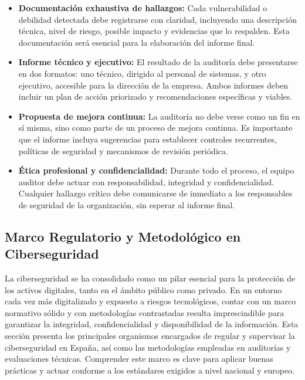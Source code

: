 \documentclass[a4paper, 11pt]{article}
\begin{document}
\begin{itemize}
    \item \textbf{Documentación exhaustiva de hallazgos:}  
    Cada vulnerabilidad o debilidad detectada debe registrarse con claridad, incluyendo una descripción técnica, nivel de riesgo, posible impacto y evidencias que lo respalden. Esta documentación será esencial para la elaboración del informe final.

    \item \textbf{Informe técnico y ejecutivo:}  
    El resultado de la auditoría debe presentarse en dos formatos: uno técnico, dirigido al personal de sistemas, y otro ejecutivo, accesible para la dirección de la empresa. Ambos informes deben incluir un plan de acción priorizado y recomendaciones específicas y viables.

    \item \textbf{Propuesta de mejora continua:}  
    La auditoría no debe verse como un fin en sí misma, sino como parte de un proceso de mejora continua. Es importante que el informe incluya sugerencias para establecer controles recurrentes, políticas de seguridad y mecanismos de revisión periódica.

    \item \textbf{Ética profesional y confidencialidad:}  
    Durante todo el proceso, el equipo auditor debe actuar con responsabilidad, integridad y confidencialidad. Cualquier hallazgo crítico debe comunicarse de inmediato a los responsables de seguridad de la organización, sin esperar al informe final.

\end{itemize}

\subsection{Marco Regulatorio y Metodológico en Ciberseguridad}

La ciberseguridad se ha consolidado como un pilar esencial para la protección de los activos digitales, tanto en el ámbito público como privado. En un entorno cada vez más digitalizado y expuesto a riesgos tecnológicos, contar con un marco normativo sólido y con metodologías contrastadas resulta imprescindible para garantizar la integridad, confidencialidad y disponibilidad de la información. Esta sección presenta los principales organismos encargados de regular y supervisar la ciberseguridad en España, así como las metodologías empleadas en auditorías y evaluaciones técnicas. Comprender este marco es clave para aplicar buenas prácticas y actuar conforme a los estándares exigidos a nivel nacional y europeo.
\end{document}
